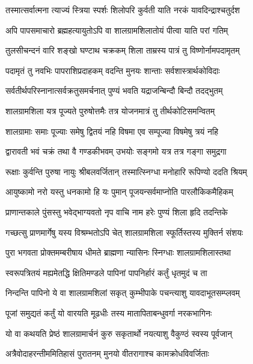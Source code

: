 \twolineshloka
{तस्मात्सर्वात्मना त्याज्यं स्त्रिया स्पर्शः शिलोपरि}
{कुर्वती याति नरकं यावदिन्द्राश्चतुर्दश}%

\twolineshloka
{अपि पापसमाचारो ब्रह्महत्यायुतोऽपि वा}
{शालग्रामशिलातोयं पीत्वा याति परां गतिम्}%

\twolineshloka
{तुलसीचन्दनं वारि शङ्खो घण्टाथ चक्रकम्}
{शिला ताम्रस्य पात्रं तु विष्णोर्नामपदामृतम्}%

\twolineshloka
{पदामृतं तु नवभिः पापराशिप्रदाहकम्}
{वदन्ति मुनयः शान्ताः सर्वशास्त्रार्थकोविदाः}%

\twolineshloka
{सर्वतीर्थपरिस्नानात्सर्वक्रतुसमर्चनात्}
{पुण्यं भवति यद्राजन्बिन्दौ बिन्दौ तदद्भुतम्}%

\twolineshloka
{शालग्रामशिला यत्र पूज्यते पुरुषोत्तमैः}
{तत्र योजनमात्रं तु तीर्थकोटिसमन्वितम्}%

\twolineshloka
{शालग्रामाः समाः पूज्याः समेषु द्वितयं नहि}
{विषमा एव सम्पूज्या विषमेषु त्रयं नहि}%

\twolineshloka
{द्वारावती भवं चक्रं तथा वै गण्डकीभवम्}
{उभयोः सङ्गमो यत्र तत्र गङ्गा समुद्रगा}%

\twolineshloka
{रूक्षाः कुर्वन्ति पुरुषा नायुः श्रीबलवर्जितान्}
{तस्मात्स्निग्धा मनोहारि रूपिण्यो ददति श्रियम्}%

\twolineshloka
{आयुष्कामो नरो यस्तु धनकामो हि यः पुमान्}
{पूजयन्सर्वमाप्नोति पारलौकिकमैहिकम्}%

\twolineshloka
{प्राणान्तकाले पुंसस्तु भवेद्भाग्यवतो नृप}
{वाचि नाम हरेः पुण्यं शिला हृदि तदन्तिके}%

\twolineshloka
{गच्छत्सु प्राणमार्गेषु यस्य विश्रम्भतोऽपि चेत्}
{शालग्रामशिला स्फूर्तिस्तस्य मुक्तिर्न संशयः}%

\twolineshloka
{पुरा भगवता प्रोक्तमम्बरीषाय धीमते}
{ब्राह्मणा न्यासिनः स्निग्धाः शालग्रामशिलास्तथा}%

\twolineshloka
{स्वरूपत्रितयं मह्यमेतद्धि क्षितिमण्डले}
{पापिनां पापनिर्हारं कर्तुं धृतमुदं च ता}%

\twolineshloka
{निन्दन्ति पापिनो ये वा शालग्रामशिलां सकृत्}
{कुम्भीपाके पचन्त्याशु यावदाभूतसम्प्लवम्}%

\twolineshloka
{पूजां समुद्यतं कर्तुं यो वारयति मूढधीः}
{तस्य मातापिताबन्धुवर्गा नरकभागिनः}%

\twolineshloka
{यो वा कथयति प्रेष्ठं शालग्रामार्चनं कुरु}
{सकृतार्थो नयत्याशु वैकुण्ठं स्वस्य पूर्वजान्}%

\twolineshloka
{अत्रैवोदाहरन्तीममितिहासं पुरातनम्}
{मुनयो वीतरागाश्च कामक्रोधविवर्जिताः}%

